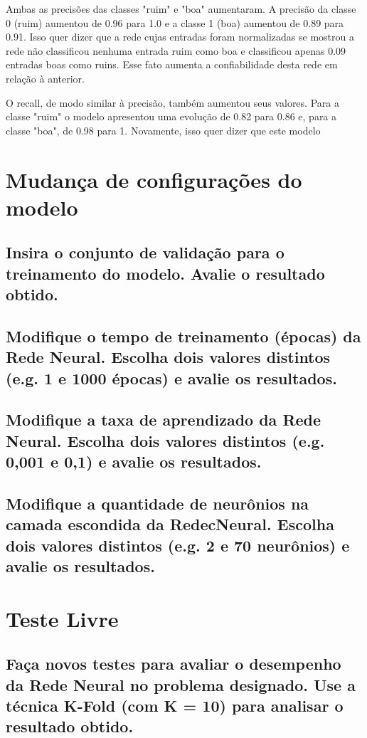 \documentclass[12pt]{article}
\begin{document}
Ambas as precisões das classes "ruim" e "boa" aumentaram. A precisão da classe 0 (ruim) aumentou de 0.96 para 1.0 e a classe 1 (boa) aumentou de 0.89 para 0.91. Isso quer dizer que a rede cujas entradas foram normalizadas se mostrou a rede não classificou nenhuma entrada ruim como boa e classificou apenas 0.09 entradas boas como ruins. Esse fato aumenta a confiabilidade desta rede em relação à anterior.

O recall, de modo similar à precisão, também aumentou seus valores. Para a classe "ruim" o modelo apresentou uma evolução de 0.82 para 0.86 e, para a classe "boa", de 0.98 para 1. Novamente, isso quer dizer que este modelo 
 
\section{Mudança de configurações do modelo}

\subsection{Insira o conjunto de validação para o treinamento do modelo. Avalie o resultado obtido.}

\subsection{Modifique o tempo de treinamento (épocas) da Rede Neural. Escolha dois valores distintos (e.g. 1 e 1000 épocas) e avalie os resultados.}

\subsection{Modifique a taxa de aprendizado da Rede Neural. Escolha dois valores distintos (e.g. 0,001 e 0,1) e avalie os resultados.}

\subsection{Modifique a quantidade de neurônios na camada escondida da RedecNeural. Escolha dois valores distintos (e.g. 2 e 70 neurônios) e avalie os	resultados.}


\section{Teste Livre}\label{sec:testelivre}

\subsection{Faça novos testes para avaliar o desempenho da Rede Neural no	problema designado. Use a técnica K-Fold (com K = 10) para analisar o	resultado obtido.}
\end{document}

